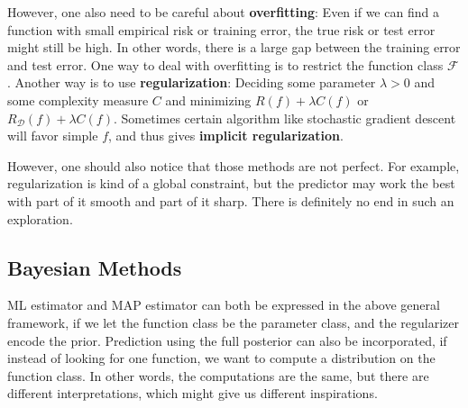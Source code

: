 \documentclass[openany]{book}
\theoremstyle{definition}
\theoremstyle{remark}
\begin{document}
However, one also need to be careful about \textbf{overfitting}: Even if we can find a function with small empirical risk or training error, the true risk or test error might still be high. In other words, there is a large gap between the training error and test error. One way to deal with overfitting is to restrict the function class $\mathcal{F}$. Another way is to use \textbf{regularization}: Deciding some parameter $\lambda>0$ and some complexity measure $C$ and minimizing $R(f)+\lambda C(f)$ or $R_{\mathcal{D}}(f)+\lambda C(f)$. Sometimes certain algorithm like stochastic gradient descent will favor simple $f$, and thus gives \textbf{implicit regularization}.

However, one should also notice that those methods are not perfect. For example, regularization is kind of a global constraint, but the predictor may work the best with part of it smooth and part of it sharp. There is definitely no end in such an exploration.

\subsection{Bayesian Methods}
ML estimator and MAP estimator can both be expressed in the above general framework, if we let the function class be the parameter class, and the regularizer encode the prior. Prediction using the full posterior can also be incorporated, if instead of looking for one function, we want to compute a distribution on the function class. In other words, the computations are the same, but there are different interpretations, which might give us different inspirations.
\end{document}
